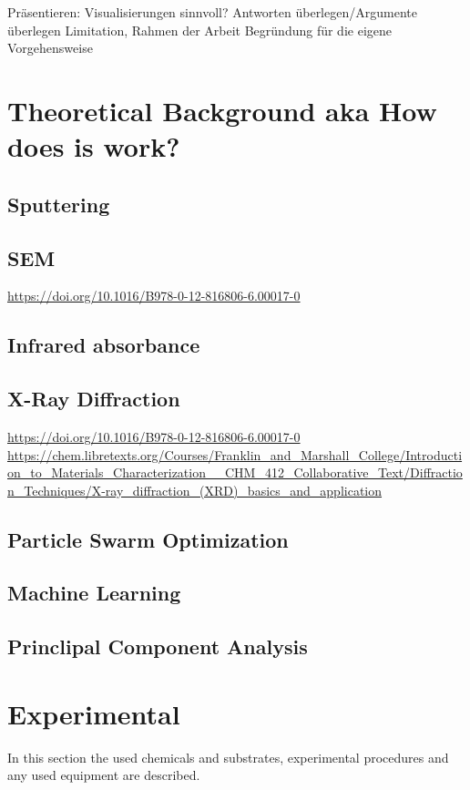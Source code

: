 \documentclass[a4paper]{article}
\begin{document}
Präsentieren: Visualisierungen sinnvoll? 
Antworten überlegen/Argumente überlegen
Limitation, Rahmen der Arbeit
Begründung für die eigene Vorgehensweise
\fi
\section{Theoretical Background aka How does is work?}
\subsection{Sputtering}
\subsection{SEM}
\url{https://doi.org/10.1016/B978-0-12-816806-6.00017-0}\\
\subsection{Infrared absorbance}
\subsection{X-Ray Diffraction}
\url{https://doi.org/10.1016/B978-0-12-816806-6.00017-0}\\
\url{https://chem.libretexts.org/Courses/Franklin_and_Marshall_College/Introduction_to_Materials_Characterization__CHM_412_Collaborative_Text/Diffraction_Techniques/X-ray_diffraction_(XRD)_basics_and_application}\\
\subsection{Particle Swarm Optimization}
\subsection{Machine Learning}
\subsection{Princlipal Component Analysis}

\clearpage
\section{Experimental}
\label{sec:exp}
In this section the used chemicals and substrates, experimental procedures and any used equipment are described. 
\end{document}
